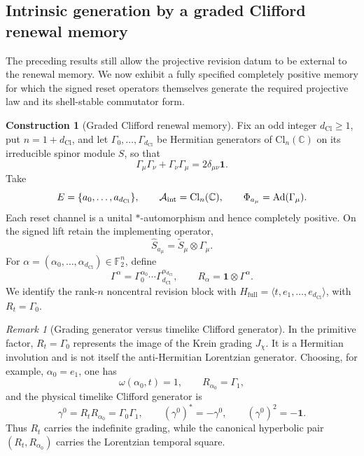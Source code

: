 \documentclass[11pt]{article}
\theoremstyle{definition}
\newtheorem{construction}[theorem]{Construction}
\theoremstyle{remark}
\newtheorem{remark}[theorem]{Remark}
\newcommand{\C}{\mathbb{C}}
\newcommand{\F}{\mathbb{F}}
\newcommand{\Hf}{H_{\mathrm{full}}}
\newcommand{\Cl}{\mathrm{Cl}}
\newcommand{\A}{\mathcal{A}}
\newcommand{\dCl}{d_{\mathrm{Cl}}}
\newcommand{\one}{\mathbf{1}}
\begin{document}
\subsection{Intrinsic generation by a graded Clifford renewal memory}
\label{subsec:graded-clifford-memory}

The preceding results still allow the projective revision datum to be external
to the renewal memory.  We now exhibit a fully specified completely positive
memory for which the signed reset operators themselves generate the required
projective law and its shell-stable commutator form.

\begin{construction}[Graded Clifford renewal memory]
\label{constr:graded-clifford-memory}
Fix an odd integer \(\dCl\ge1\), put \(n=1+\dCl\), and let
\(\Gamma_0,\ldots,\Gamma_{\dCl}\) be Hermitian generators of
\(\Cl_n(\C)\) on its irreducible spinor module \(S\), so that
\[
 \Gamma_\mu\Gamma_\nu+\Gamma_\nu\Gamma_\mu
 =2\delta_{\mu\nu}\one .
\]
Take
\[
 E=\{a_0,\ldots,a_{\dCl}\},\qquad
 \A_{\rm int}=\Cl_n(\C),\qquad
 \Phi_{a_\mu}=\operatorname{Ad}(\Gamma_\mu).
\]
Each reset channel is a unital \(*\)-automorphism and hence completely
positive.  On the signed lift retain the implementing operator,
\[
 \widehat S_{a_\mu}=\widetilde S_\mu\otimes\Gamma_\mu.
\]
For \(\alpha=(\alpha_0,\ldots,\alpha_{\dCl})\in\F_2^n\), define
\[
 \Gamma^\alpha=
 \Gamma_0^{\alpha_0}\cdots\Gamma_{\dCl}^{\alpha_{\dCl}},
 \qquad
 R_\alpha=\one\otimes\Gamma^\alpha .
\]
We identify the rank-\(n\) noncentral revision block with
\(\Hf=\langle t,e_1,\ldots,e_{\dCl}\rangle\), with \(R_t=\Gamma_0\).
\end{construction}

\begin{remark}[Grading generator versus timelike Clifford generator]
\label{rem:graded-model-temporal-generator}
In the primitive factor, \(R_t=\Gamma_0\) represents the image of the Krein
grading \(J_\chi\).  It is a Hermitian involution and is not itself the
anti-Hermitian Lorentzian generator.  Choosing, for example,
\(\alpha_0=e_1\), one has
\[
  \omega(\alpha_0,t)=1,
  \qquad
  R_{\alpha_0}=\Gamma_1,
\]
and the physical timelike Clifford generator is
\[
  \gamma^0=R_tR_{\alpha_0}=\Gamma_0\Gamma_1,
  \qquad
  (\gamma^0)^*=-\gamma^0,
  \qquad
  (\gamma^0)^2=-\one.
\]
Thus \(R_t\) carries the indefinite grading, while the canonical hyperbolic
pair \((R_t,R_{\alpha_0})\) carries the Lorentzian temporal square.
\end{remark}
\end{document}
